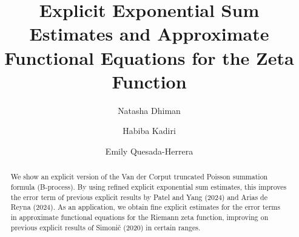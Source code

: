 \documentclass[11pt,letterpaper,oneside,reqno]{amsart}
\renewcommand{\^}[1]{\widehat{#1}}
\numberwithin{equation}{section}
\theoremstyle{remark}
\begin{document}
\title[Exponential Sums and Approximate Functional Equations for Zeta]{Explicit Exponential Sum Estimates and Approximate Functional Equations for the Zeta Function}

\author[N. Dhiman]{Natasha Dhiman}
\address{Department of Mathematics and Computer Science\\
University of Lethbridge\\
4401 University Drive\\
Lethbridge, Alberta\\
T1K 3M4 Canada}

\author[H. Kadiri]{Habiba Kadiri}
\address{Department of Mathematics and Computer Science\\
University of Lethbridge\\
4401 University Drive\\
Lethbridge, Alberta\\
T1K 3M4 Canada}

\author[E. Quesada-Herrera]{Emily Quesada-Herrera}
\address{Department of Mathematics and Computer Science\\
University of Lethbridge\\
4401 University Drive\\
Lethbridge, Alberta\\
T1K 3M4 Canada}

\begin{abstract}
We show an explicit version of the Van der Corput truncated Poisson summation formula (B-process). By using refined explicit exponential sum estimates, this improves the error term of previous explicit results by Patel and Yang (2024) and Arias de Reyna (2024). As an application, we obtain fine explicit estimates for the error terms in approximate functional equations for the Riemann zeta function, improving on previous explicit results of Simoni\v{c} (2020) in certain ranges.
\end{abstract}



\maketitle
\end{document}
